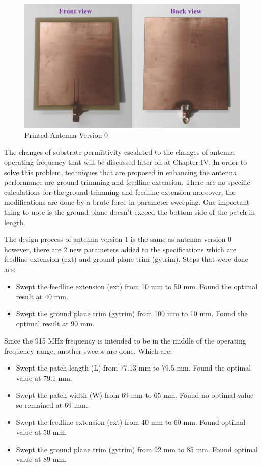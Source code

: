 \documentclass[conference]{IEEEtran}
\begin{document}
\begin{figure}[htbp]
  \centering
  \includegraphics[width=0.9\columnwidth]{figures/antenna_version_0}
  \caption{Printed Antenna Version 0}
  \label{fig:fig2}
\end{figure}

The changes of substrate permittivity escalated to the changes of antenna operating frequency that will be discussed later on at Chapter IV. In order to solve this problem, techniques that are proposed in enhancing the antenna performance are ground trimming and feedline extension. There are no specific calculations for the ground trimming and feedline extension moreover, the modifications are done by a brute force in parameter sweeping. One important thing to note is the ground plane doesn't exceed the bottom side of the patch in length.

The design process of antenna version 1 is the same as antenna version 0 however, there are 2 new parameters added to the specifications which are feedline extension (ext) and ground plane trim (gytrim). Steps that were done are:
\begin{itemize}
  \item Swept the feedline extension (ext) from 10 mm to 50 mm. Found the optimal result at 40 mm.
  \item Swept the ground plane trim (gytrim) from 100 mm to 10 mm. Found the optimal result at 90 mm.
\end{itemize} 

Since the 915 MHz frequency is intended to be in the middle of the operating frequency range, another sweeps are done. Which are:
\begin{itemize}
  \item Swept the patch length (L) from 77.13 mm to 79.5 mm. Found the optimal value at 79.1 mm.
  \item Swept the patch width (W) from 69 mm to 65 mm. Found no optimal value so remained at 69 mm.
  \item Swept the feedline extension (ext) from 40 mm to 60 mm. Found optimal value at 50 mm.
  \item Swept the ground plane trim (gytrim) from 92 mm to 85 mm. Found optimal value at 89 mm.
\end{itemize} 
\end{document}
